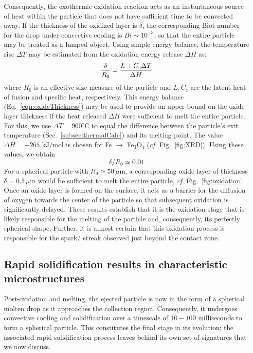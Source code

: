 \documentclass[11pt]{article}
\begin{document}
Consequently, the exothermic oxidation reaction acts as an instantaneous source of heat within the particle that does not have sufficient time to be convected away. If the thickness of the oxidized layer is $\delta$, the corresponding Biot number for the drop under convective cooling is $Bi \sim 10^{-3}$, so that the entire particle may be treated as a lumped object. Using simple energy balance, the temperature rise $\Delta T$ may be estimated from the oxidation energy release $\Delta H$ as:
\begin{equation}{\label{eqn:oxideThickness}}
	\frac{\delta}{R_0}  = \frac{L+C_{c} \Delta T}{\Delta H} 
\end{equation}  
where $R_0$ is an effective size measure of the particle and $L, C_c$ are the latent heat of fusion and specific heat, respectively. This energy balance (Eq.~\ref{eqn:oxideThickness}) may be used to provide an upper bound on the oxide layer thickness if the heat released $\Delta H$ were sufficient to melt the entire particle. For this, we use $\Delta T = 900^\circ$C to equal the difference between the particle's exit temperature (Sec.~\ref{subsec:thermalCalc}) and its melting point. The value $\Delta H = -265$ kJ/mol is chosen for Fe $\to$ Fe$_3$O$_4$ (\emph{cf.} Fig.~\ref{fig:XRD}). Using these values, we obtain
\begin{equation}
  \delta/R_0 \simeq 0.01
\end{equation}
For a spherical particle with $R_0\simeq 50\,\mu$m, a corresponding oxide layer of thickness $\delta = 0.5\,\mu$m would be sufficient to melt the entire particle, \emph{cf.} Fig.~\ref{fig:oxidation}. Once an oxide layer is formed on the surface, it acts as a barrier for the diffusion of oxygen towards the center of the particle so that subsequent oxidation is significantly delayed. These results establish that it is the oxidation stage that is likely responsible for the melting of the particle and, consequently, its perfectly spherical shape. Further, it is almost certain that this oxidation process is responsible for the spark/ streak observed just beyond the contact zone. 


\subsection{Rapid solidification results in characteristic microstructures}
\label{subsec:solidification}

Post-oxidation and melting, the ejected particle is now in the form of a spherical molten drop as it approaches the collection region. Consequently, it undergoes convective cooling and solidification over a timescale of $10-100$ milliseconds to form a spherical particle. This constitutes the final stage in its evolution; the associated rapid solidification process leaves behind its own set of signatures that we now discuss.
\end{document}
